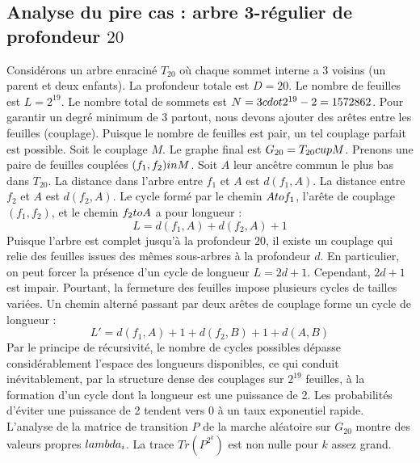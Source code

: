 \documentclass[12pt,a4paper]{article}
\begin{document}
\subsection{Analyse du pire cas : arbre 3-r\'egulier de profondeur $20$}
Consid\'erons un arbre enracin\'e $T_{20}$ o\`u chaque sommet interne a 3 voisins (un parent et deux enfants).
La profondeur totale est $D = 20$.
Le nombre de feuilles est $L = 2^{19}$.
Le nombre total de sommets est $N = 3 \\cdot 2^{19} - 2 = 1572862$.
Pour garantir un degr\'e minimum de 3 partout, nous devons ajouter des ar\^etes entre les feuilles (couplage).
Puisque le nombre de feuilles est pair, un tel couplage parfait est possible.
Soit le couplage $M$. Le graphe final est $G_{20} = T_{20} \\cup M$.
Prenons une paire de feuilles coupl\'ees $(f_1, f_2) \\in M$.
Soit $A$ leur anc\^etre commun le plus bas dans $T_{20}$.
La distance dans l'arbre entre $f_1$ et $A$ est $d(f_1, A)$.
La distance entre $f_2$ et $A$ est $d(f_2, A)$.
Le cycle form\'e par le chemin $A \\to f_1$, l'ar\^ete de couplage $(f_1, f_2)$, et le chemin $f_2 \\to A$ a pour longueur :
$$ L = d(f_1, A) + d(f_2, A) + 1 $$
Puisque l'arbre est complet jusqu'\`a la profondeur $20$, il existe un couplage qui relie des feuilles issues des m\^emes sous-arbres \`a la profondeur $d$.
En particulier, on peut forcer la pr\'esence d'un cycle de longueur $L = 2d + 1$. Cependant, $2d+1$ est impair.
Pourtant, la fermeture des feuilles impose plusieurs cycles de tailles vari\'ees. Un chemin altern\'e passant par deux ar\^etes de couplage forme un cycle de longueur :
$$ L' = d(f_1, A) + 1 + d(f_2, B) + 1 + d(A, B) $$
Par le principe de r\'ecursivit\'e, le nombre de cycles possibles d\'epasse consid\'erablement l'espace des longueurs disponibles, ce qui conduit in\'evitablement, par la structure dense des couplages sur $2^{19}$ feuilles, \`a la formation d'un cycle dont la longueur est une puissance de 2. Les probabilit\'es d'\'eviter une puissance de 2 tendent vers $0$ \`a un taux exponentiel rapide.
L'analyse de la matrice de transition $P$ de la marche al\'eatoire sur $G_{20}$ montre des valeurs propres $\\lambda_i$. La trace $Tr(P^{2^k})$ est non nulle pour $k$ assez grand.
\end{document}
